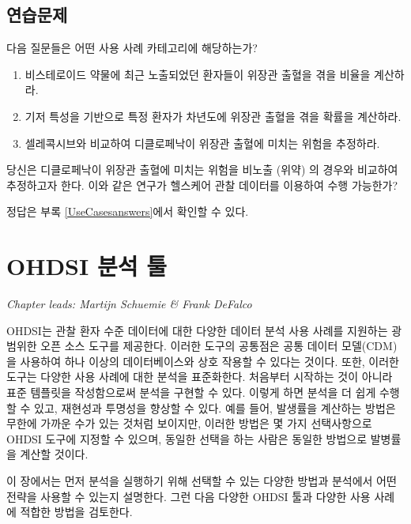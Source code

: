\documentclass[11pt]{book}
\theoremstyle{definition}
\theoremstyle{definition}
\theoremstyle{definition}
\theoremstyle{remark}
\let\BeginKnitrBlock\begin \let\EndKnitrBlock\end
\begin{document}
\section{연습문제}

\BeginKnitrBlock{exercise}
\protect\hypertarget{exr:exerciseUseCases1}{}{\label{exr:exerciseUseCases1}
}다음 질문들은 어떤 사용 사례 카테고리에 해당하는가?

\begin{enumerate}
\def\labelenumi{\arabic{enumi}.}
\item
  비스테로이드 약물에 최근 노출되었던 환자들이 위장관 출혈을 겪을 비율을
  계산하라.
\item
  기저 특성을 기반으로 특정 환자가 차년도에 위장관 출혈을 겪을 확률을
  계산하라.
\item
  셀레콕시브와 비교하여 디클로페낙이 위장관 출혈에 미치는 위험을
  추정하라.
\end{enumerate}
\EndKnitrBlock{exercise}

\BeginKnitrBlock{exercise}
\protect\hypertarget{exr:exerciseUseCases2}{}{\label{exr:exerciseUseCases2}
}당신은 디클로페낙이 위장관 출혈에 미치는 위험을 비노출 (위약) 의 경우와
비교하여 추정하고자 한다. 이와 같은 연구가 헬스케어 관찰 데이터를
이용하여 수행 가능한가?
\EndKnitrBlock{exercise}

정답은 부록 \ref{UseCasesanswers}에서 확인할 수 있다.

\chapter{OHDSI 분석 툴}\label{OhdsiAnalyticsTools}

\emph{Chapter leads: Martijn Schuemie \& Frank DeFalco}

OHDSI는 관찰 환자 수준 데이터에 대한 다양한 데이터 분석 사용 사례를
지원하는 광범위한 오픈 소스 도구를 제공한다. 이러한 도구의 공통점은 공통
데이터 모델(CDM)을 사용하여 하나 이상의 데이터베이스와 상호 작용할 수
있다는 것이다. 또한, 이러한 도구는 다양한 사용 사례에 대한 분석을
표준화한다. 처음부터 시작하는 것이 아니라 표준 템플릿을 작성함으로써
분석을 구현할 수 있다. 이렇게 하면 분석을 더 쉽게 수행할 수 있고,
재현성과 투명성을 향상할 수 있다. 예를 들어, 발생률을 계산하는 방법은
무한에 가까운 수가 있는 것처럼 보이지만, 이러한 방법은 몇 가지
선택사항으로 OHDSI 도구에 지정할 수 있으며, 동일한 선택을 하는 사람은
동일한 방법으로 발병률을 계산할 것이다.

이 장에서는 먼저 분석을 실행하기 위해 선택할 수 있는 다양한 방법과
분석에서 어떤 전략을 사용할 수 있는지 설명한다. 그런 다음 다양한 OHDSI
툴과 다양한 사용 사례에 적합한 방법을 검토한다.
\end{document}
